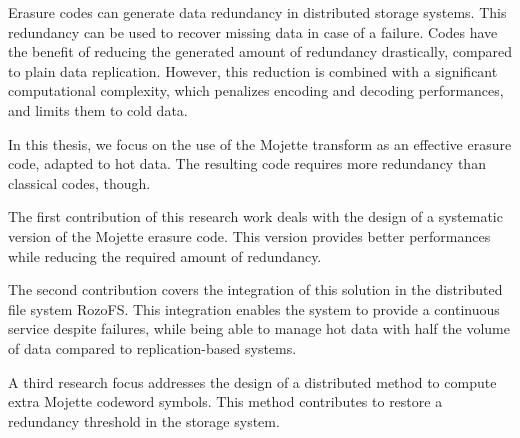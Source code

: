 Erasure codes can generate data redundancy in distributed storage systems.
This redundancy can be used to recover missing data in case of a failure. Codes
have the benefit of reducing the generated amount of redundancy drastically,
compared to plain data replication. However, this reduction is combined with a
significant computational complexity, which penalizes encoding and decoding
performances, and limits them to cold data.

In this thesis, we focus on the use of the Mojette transform as an effective
erasure code, adapted to hot data. The resulting code requires more redundancy
than classical codes, though.

The first contribution of this research work deals with the design of a
systematic version of the Mojette erasure code. This version provides better
performances while reducing the required amount of redundancy.

The second contribution covers the integration of this solution in the
distributed file system RozoFS. This integration enables the system to provide
a continuous service despite failures, while being able to manage hot data with
half the volume of data compared to replication-based systems.

A third research focus addresses the design of a distributed method to compute
extra Mojette codeword symbols. This method contributes to restore a redundancy
threshold in the storage system.
